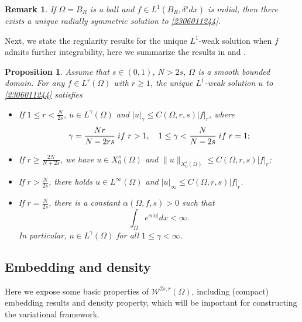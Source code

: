 \documentclass[10pt]{article}
\numberwithin{equation}{section}
\newtheorem{proposition}[theorem]{Proposition}
\newtheorem{remark}[theorem]{Remark}
\def \O{\Omega}
\numberwithin{equation}{section}
\begin{document}
\begin{remark}\label{2402062112}
If $\Omega = B_R$ is a ball and $f\in L^1(B_R, \delta^s dx)$ is radial, then there exists a unique radially symmetric solution to \eqref{2306011244}.
\end{remark}

Next, we state the regularity results for the unique $L^1$-weak solution when $f$ admits further integrability, here we summarize the results in \cite{LPPS2015} and \cite[Lemma 2.5]{BWZ2017}.
\begin{proposition}\label{2211162013}
Assume that $s\in (0, 1)$, $N>2s$, $\Omega$ is a smooth bounded domain. For any $f\in L^r(\Omega)$ with $r\ge 1$, the unique $L^1$-weak solution $u$ to \eqref{2306011244} satisfies
\begin{itemize}
\item[\rm (i)] If $1 \le r < \frac{N}{2s}$, $u\in L^{\gamma}(\Omega)$ and $|u|_{\gamma}\le C(\Omega, r, s)|f|_r$,
where
\[
\gamma={\frac{Nr}{N-2rs}}\; {\rm if }\; r>1, \quad 1\le \gamma<\frac{N}{N-2s}\;{\rm if }\; r=1;
\]
\item[\rm (ii)] If $r \ge \frac{2N}{N+2s}$, we have $u\in X_0^s(\Omega)$ and $\|u\|_{X_0^s(\Omega)}\le C(\Omega, r, s)|f|_r$;
\item[\rm (iii)] If $r>\frac{N}{2s}$, there holds $u\in L^{\infty}(\Omega)$ and $|u|_{\infty}\le C(\Omega, r, s)|f|_{r}$.
\item[\rm (iv)] If $r=\frac{N}{2s}$, there is a constant $\alpha(\O, f, s) >0$ such that
\[
\int_{\Omega} e^{\alpha |u|} dx<\infty.
\]
In particular, $u\in L^\gamma(\Omega)$ for all $1\le \gamma<\infty$.
\end{itemize}
\end{proposition}

\subsection{Embedding and density}
Here we expose some basic properties of $\mathcal{W}^{2s, r}(\Omega)$, including (compact) embedding results and density property, which will be important for constructing the variational framework.
\end{document}
